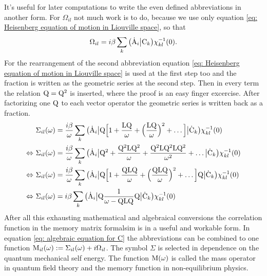 
It's useful for later computations to write the even defined abbreviations in another form.
For $\Omega_{il}$ not much work is to do, because we use only equation \eqref{eq: Heisenberg equation of motion in Liouville space}, so that
%
\begin{align}
	\Omega_{il} = i \beta \sum\limits_{k} \big({\dot{\mathrm{A}}_{i}}\big|{\mathrm{C}_{k}}\big) \chi_{kl}^{-1}(0).
	\label{eq: Omega}
\end{align}
%
For the rearrangement of the second abbreviation equation \eqref{eq: Heisenberg equation of motion in Liouville space} is used at the first step too and the fraction is written as the geometric series at the second step.
Then in every term the relation $\mathrm{Q} = \mathrm{Q}^{2}$ is inserted, where the proof is an easy finger excercise.
After factorizing one $\mathrm{Q}$ to each vector operator the geometric series is written back as a fraction.
%
\begin{align}
	&\Sigma_{il}(\omega) = \frac{i \beta}{\omega} \sum\limits_{k} \big({\dot{\mathrm{A}}_{i}}\big| \mathrm{Q} \Big[1 + \frac{\mathrm{LQ}}{\omega} + \Big(\frac{\mathrm{LQ}}{\omega}\Big)^{2} + \dots\Big] \big|{\dot{\mathrm{C}}_{k}}\big) \chi_{kl}^{-1}(0)
	\notag \\
	\Leftrightarrow\ &\Sigma_{il}(\omega) = \frac{i \beta}{\omega} \sum\limits_{k} \big({\dot{\mathrm{A}}_{i}}\big| \mathrm{Q}^{2} + \frac{\mathrm{Q^{2}LQ^{2}}}{\omega} + \frac{\mathrm{Q^{2}LQ^{2}LQ^{2}}}{\omega^{2}} + \dots\big|{\dot{\mathrm{C}}_{k}}\big) \chi_{kl}^{-1}(0)
	\notag \\
	\Leftrightarrow\ &\Sigma_{il}(\omega) = \frac{i \beta}{\omega} \sum\limits_{k} \big({\dot{\mathrm{A}}_{i}}\big| \mathrm{Q} \Big[1 + \frac{\mathrm{QLQ}}{\omega} + \Big(\frac{\mathrm{QLQ}}{\omega}\Big)^{2} + \dots\Big] \mathrm{Q} \big|{\dot{\mathrm{C}}_{k}}\big) \chi_{kl}^{-1}(0)
	\notag \\
	\Leftrightarrow\ &\Sigma_{il}(\omega) = i \beta \sum\limits_{k} \big({\dot{\mathrm{A}}_{i}}\big| \mathrm{Q} \frac{1}{\omega - \mathrm{QLQ}} \mathrm{Q} \big|{\dot{\mathrm{C}}_{k}}\big) \chi_{kl}^{-1}(0)
	\label{eq: Sigma(z)}
\end{align} 
%
After all this exhausting mathematical and algebraical conversions the correlation function in the memory matrix formalsim is in a useful and workable form.
In equation \eqref{eq: algebraic equation for C} the abbreviations can be combined to one function $\mathrm{M}_{il}(\omega) := \Sigma_{il}(\omega) +i \Omega_{il}$.
The symbol $\Sigma$ is selected in dependence on the quantum mechanical self energy.
The function $\mathrm{M}(\omega)$ is called the mass operator in quantum field theory and the memory function in non-equilibrium physics.

